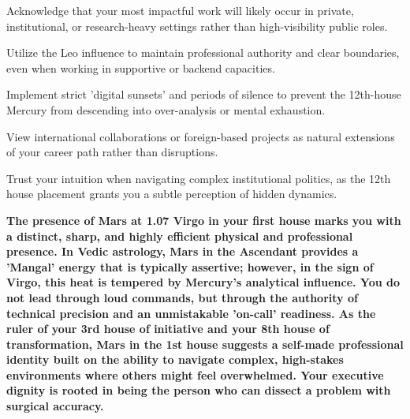 \begin{diamondlist}
  \item {\fontsize{8.5}{12}\selectfont Acknowledge that your most impactful work will likely occur in private, institutional, or research-heavy settings rather than high-visibility public roles.}
  \item {\fontsize{8.5}{12}\selectfont Utilize the Leo influence to maintain professional authority and clear boundaries, even when working in supportive or backend capacities.}
  \item {\fontsize{8.5}{12}\selectfont Implement strict 'digital sunsets' and periods of silence to prevent the 12th-house Mercury from descending into over-analysis or mental exhaustion.}
  \item {\fontsize{8.5}{12}\selectfont View international collaborations or foreign-based projects as natural extensions of your career path rather than disruptions.}
  \item {\fontsize{8.5}{12}\selectfont Trust your intuition when navigating complex institutional politics, as the 12th house placement grants you a subtle perception of hidden dynamics.}
\end{diamondlist}


\label{topic9}

{\fontsize{9.5}{13.8}\selectfont\bfseries\color{DeepSlate} The presence of Mars at 1.07\textdegree{} Virgo in your first house marks you with a distinct, sharp, and highly efficient physical and professional presence. In Vedic astrology, Mars in the Ascendant provides a 'Mangal' energy that is typically assertive; however, in the sign of Virgo, this heat is tempered by Mercury's analytical influence. You do not lead through loud commands, but through the authority of technical precision and an unmistakable 'on-call' readiness. As the ruler of your 3rd house of initiative and your 8th house of transformation, Mars in the 1st house suggests a self-made professional identity built on the ability to navigate complex, high-stakes environments where others might feel overwhelmed. Your executive dignity is rooted in being the person who can dissect a problem with surgical accuracy.}\par\vspace{2mm}

